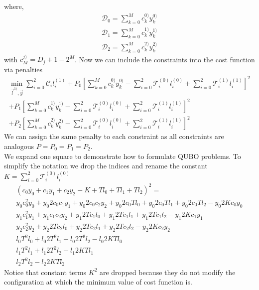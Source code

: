 where,
\begin{align}
    \mathcal{D}_{0} = \sum_{k=0}^{M}c_{k}^{0)}y_{k}^{0)} \\
    \mathcal{D}_{1} = \sum_{k=0}^{M}c_{k}^{1)}y_{k}^{1)} \\
    \mathcal{D}_{2} = \sum_{k=0}^{M}c_{k}^{2)}y_{k}^{2)}
\end{align}
with $c_{M}^{j)} = D_{j} + 1 - 2^{M}$. Now we can include the constraints into the cost function via penalties
\begin{align}
    \min_{\vec{l}^{1)},\vec{y} }\sum_{i=0}^{2}\mathcal{C}_{i}l_{i}^{(1)} + P_{0}\left[\sum_{k=0}^{M}c_{k}^{0)}y_{k}^{0)} - \sum_{i=0}^{2}\mathcal{T}_{i}^{(0)}l_{i}^{(0)} + \sum_{i=0}^{2}\mathcal{T}_{i}^{(1)}l_{i}^{(1)}\right]^{2} \\
    + P_{1}\left[\sum_{k=0}^{M}c_{k}^{1)}y_{k}^{1)} - \sum_{i=0}^{2}\mathcal{T}_{i}^{(0)}l_{i}^{(0)} + \sum_{i=0}^{2}\mathcal{T}_{i}^{(1)}l_{i}^{(1)}\right]^{2}\\
    + P_{2}\left[\sum_{k=0}^{M}c_{k}^{2)}y_{k}^{2)} - \sum_{i=0}^{2}\mathcal{T}_{i}^{(0)}l_{i}^{(0)} + \sum_{i=0}^{2}\mathcal{T}_{i}^{(1)}l_{i}^{(1)}\right]^{2}  
\end{align}
We can assign the same penalty to each constraint as all constraints are analogous $P = P_{0} = P_{1} = P_{2}$.\\
We expand one square to demonstrate how to formulate QUBO problems. To simplify the notation we drop the indices and rename the constant $K = \sum_{i=0}^{2}\mathcal{T}_{i}^{(0)}l_{i}^{(0)}$
\begin{align*}
    \left(c_{0}y_{0} + c_{1}y_{1} + c_{2}y_{2} - K + Tl_{0}+ Tl_{1} + Tl_{2}\right)^{2} = \\
    y_{0}c_{0}^{2}y_{0} + y_{0}2c_{0}c_{1}y_{1} + y_{0}2c_{0}c_{2}y_{2} + y_{0}2c_{0}Tl_{0} + y_{0}2c_{0}Tl_{1} + y_{0}2c_{0}Tl_{2} - y_{0}2Kc_{0}y_{0}\\
    y_{1}c_{1}^{2}y_{1} + y_{1}c_{1}c_{2}y_{2} + y_{1}2Tc_{1}l_{0} + y_{1}2Tc_{1}l_{1} + y_{1}2Tc_{1}l_{2} - y_{1}2Kc_{1}y_{1}\\
    y_{2}c_{2}^{2}y_{2} + y_{2}2Tc_{2}l_{0} + y_{2}2Tc_{2}l_{1} + y_{2}2Tc_{2}l_{2} - y_{2}2Kc_{2}y_{2}\\
    l_{0}T^{2}l_{0} + l_{0}2T^{2}l_{1} + l_{0}2T^{2}l_{2} - l_{0}2KTl_{0}\\
    l_{1}T^{2}l_{1} + l_{1}2T^{2}l_{2} - l_{1}2KTl_{1}\\
    l_{2}T^{2}l_{2} - l_{2}2KTl_{2} 
\end{align*}
Notice that constant terms $K^{2}$ are dropped because they do not modify the configuration at which the minimum value of cost function is. \\
